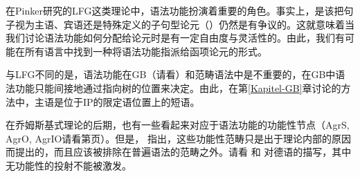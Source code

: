 在Pinker研究的LFG\indexlfgc{}这类理论中，语法功能扮演着重要的角色。事实上，是该把句子视为主语、宾语还是特殊定义的子句型论元（\xcompc）\citep*{DL2000a-u,Berman2003b-u,Berman2007a-u,AMM2005a-u,Forst2006a-u}仍然是有争议的。这就意味着当我们讨论语法功能如何分配给论元时是有一定自由度与灵活性的。由此，我们有可能在所有语言中找到一种将语法功能指派给函项论元的形式。

与LFG不同的是，语法功能在GB（请看\citealp{Williams84a,Sternefeld85a}）和范畴语法\indexcgc 中是不重要的，在GB中语法功能只能间接地通过指向树的位置来决定。由此，在第\ref{Kapitel-GB}章讨论的方法中，主语是位于IP的限定语位置上的短语。

在乔姆斯基式理论的后期，也有一些看起来对应于语法功能的功能性节点（AgrS,
AgrO, AgrIO请看第\pageref{Seite-AgrO}页）。但是， \citet[\S~4.10.1]{Chomsky95a-u}指出，这些功能性范畴只是出于理论内部的原因而提出的，而且应该被排除在普遍语法的范畴之外。请看 和 对德语的描写，其中无功能性的投射不能被激发。

